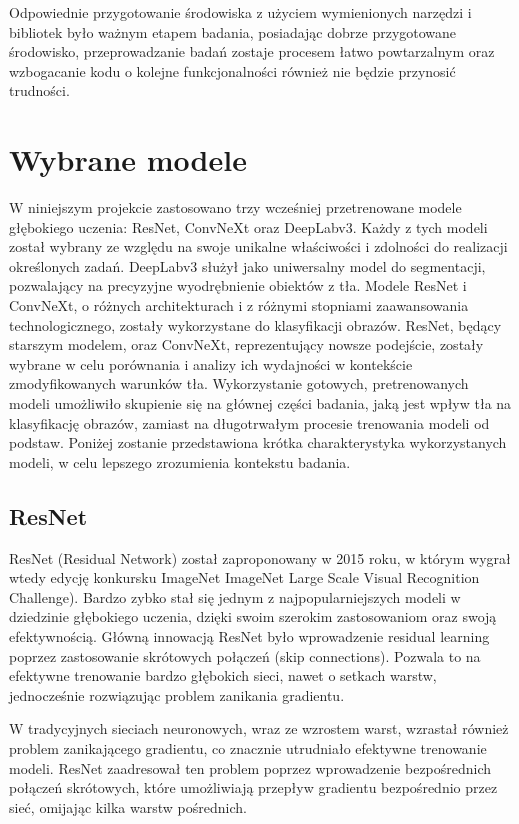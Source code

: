 Odpowiednie przygotowanie środowiska z użyciem wymienionych narzędzi i bibliotek było ważnym etapem badania, posiadając dobrze przygotowane środowisko, przeprowadzanie badań zostaje procesem łatwo powtarzalnym oraz wzbogacanie kodu o kolejne 
funkcjonalności również nie będzie przynosić trudności. 

\section*{Wybrane modele}

W niniejszym projekcie zastosowano trzy wcześniej przetrenowane modele głębokiego uczenia: ResNet, ConvNeXt oraz DeepLabv3. Każdy z tych modeli został wybrany ze względu na swoje unikalne właściwości i zdolności do realizacji określonych zadań. 
DeepLabv3 służył jako uniwersalny model do segmentacji, pozwalający na precyzyjne wyodrębnienie obiektów z tła. Modele ResNet i ConvNeXt, o różnych architekturach i z różnymi stopniami zaawansowania technologicznego, zostały wykorzystane do 
klasyfikacji obrazów. ResNet, będący starszym modelem, oraz ConvNeXt, reprezentujący nowsze podejście, zostały wybrane w celu porównania i analizy ich wydajności w kontekście zmodyfikowanych warunków tła. Wykorzystanie gotowych, pretrenowanych 
modeli umożliwiło skupienie się na głównej części badania, jaką jest wpływ tła na klasyfikację obrazów, zamiast na długotrwałym procesie trenowania modeli od podstaw. Poniżej zostanie przedstawiona krótka charakterystyka wykorzystanych modeli,
w celu lepszego zrozumienia kontekstu badania.

\subsection*{ResNet}

ResNet (Residual Network) został zaproponowany w 2015 roku, w którym wygrał wtedy edycję konkursku ImageNet ImageNet Large Scale Visual Recognition Challenge). Bardzo zybko stał się jednym z najpopularniejszych modeli w dziedzinie głębokiego 
uczenia, dzięki swoim szerokim zastosowaniom oraz swoją efektywnością. Główną innowacją ResNet było wprowadzenie residual learning poprzez zastosowanie skrótowych połączeń (skip connections). Pozwala to na efektywne trenowanie bardzo głębokich 
sieci, nawet o setkach warstw, jednocześnie rozwiązując problem zanikania gradientu.

W tradycyjnych sieciach neuronowych, wraz ze wzrostem warst, wzrastał również problem zanikającego gradientu, co znacznie utrudniało efektywne trenowanie modeli. ResNet zaadresował ten problem poprzez wprowadzenie bezpośrednich połączeń 
skrótowych, które umożliwiają przepływ gradientu bezpośrednio przez sieć, omijając kilka warstw pośrednich.

